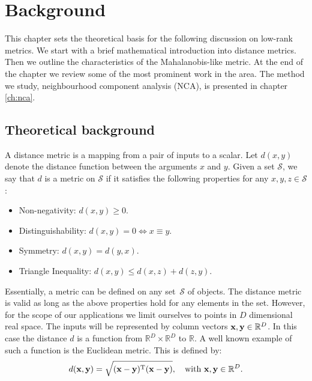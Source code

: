 \chapter{Background}

This chapter sets the theoretical basis for the following discussion on low-rank metrics. We start with a brief mathematical introduction into distance metrics. Then we outline the characteristics of the Mahalanobis-like metric. At the end of the chapter we review some of the most prominent work in the area. The method we study, neighbourhood component analysis (NCA), is presented in chapter \ref{ch:nca}.

\section{Theoretical background}
\label{sec:theoretical-background}
  A distance metric is a mapping from a pair of inputs to a scalar. Let $d(x,y)$ denote the distance function between the arguments $x$ and $y$. Given a set $\mathcal{S}$, we say that $d$ is a metric on $\mathcal{S}$ if it satisfies the following properties for any $x,y,z\in\mathcal{S}$:
	\begin{itemize}
		\item Non-negativity: $d(x,y) \ge 0$.
		\item Distinguishability: $d(x,y)=0 \Leftrightarrow  x\equiv y$.
		\item Symmetry: $d(x,y)=d(y,x)$.
		\item Triangle Inequality: $d(x,y)\leq d(x,z) + d(z,y)$.
	\end{itemize}
	
	Essentially, a metric can be defined on any set~$\mathcal{S}$ of objects. The distance metric is valid as long as the above properties hold for any elements in the set. However, for the scope of our applications we limit ourselves to points in $D$ dimensional real space. The inputs will be represented by column vectors $\mathbf{x},\mathbf{y} \in \mathbb{R}^D$. In this case the distance $d$ is a function from $\mathbb{R}^D\times\mathbb{R}^D$ to $\mathbb{R}$. A well known example of such a function is the Euclidean metric. This is defined by:
	\begin{align}
		 d(\mathbf{x},\mathbf{y}) = \sqrt{(\mathbf{x-y})^\textrm{T}(\mathbf{x-y})}, \quad\mbox{with }\mathbf{x,y}\in \mathbb{R}^D.
	\end{align}
	
